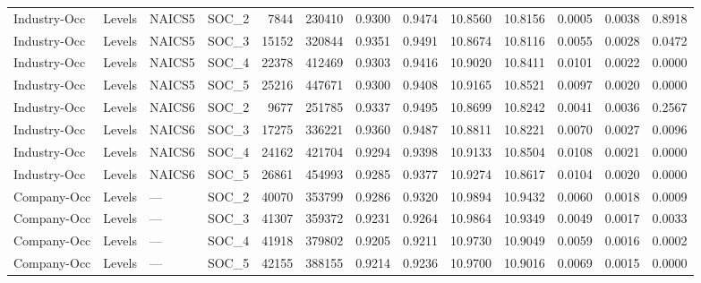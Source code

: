 \begin{table}
\begin{tabular}{lllrrrrrrrrr}
Industry-Occ & Levels & NAICS5 & SOC_2 & 7844 & 230410 & 0.9300 & 0.9474 & 10.8560 & 10.8156 & 0.0005 & 0.0038 & 0.8918 \\
Industry-Occ & Levels & NAICS5 & SOC_3 & 15152 & 320844 & 0.9351 & 0.9491 & 10.8674 & 10.8116 & 0.0055 & 0.0028 & 0.0472 \\
Industry-Occ & Levels & NAICS5 & SOC_4 & 22378 & 412469 & 0.9303 & 0.9416 & 10.9020 & 10.8411 & 0.0101 & 0.0022 & 0.0000 \\
Industry-Occ & Levels & NAICS5 & SOC_5 & 25216 & 447671 & 0.9300 & 0.9408 & 10.9165 & 10.8521 & 0.0097 & 0.0020 & 0.0000 \\
Industry-Occ & Levels & NAICS6 & SOC_2 & 9677 & 251785 & 0.9337 & 0.9495 & 10.8699 & 10.8242 & 0.0041 & 0.0036 & 0.2567 \\
Industry-Occ & Levels & NAICS6 & SOC_3 & 17275 & 336221 & 0.9360 & 0.9487 & 10.8811 & 10.8221 & 0.0070 & 0.0027 & 0.0096 \\
Industry-Occ & Levels & NAICS6 & SOC_4 & 24162 & 421704 & 0.9294 & 0.9398 & 10.9133 & 10.8504 & 0.0108 & 0.0021 & 0.0000 \\
Industry-Occ & Levels & NAICS6 & SOC_5 & 26861 & 454993 & 0.9285 & 0.9377 & 10.9274 & 10.8617 & 0.0104 & 0.0020 & 0.0000 \\
Company-Occ & Levels & — & SOC_2 & 40070 & 353799 & 0.9286 & 0.9320 & 10.9894 & 10.9432 & 0.0060 & 0.0018 & 0.0009 \\
Company-Occ & Levels & — & SOC_3 & 41307 & 359372 & 0.9231 & 0.9264 & 10.9864 & 10.9349 & 0.0049 & 0.0017 & 0.0033 \\
Company-Occ & Levels & — & SOC_4 & 41918 & 379802 & 0.9205 & 0.9211 & 10.9730 & 10.9049 & 0.0059 & 0.0016 & 0.0002 \\
Company-Occ & Levels & — & SOC_5 & 42155 & 388155 & 0.9214 & 0.9236 & 10.9700 & 10.9016 & 0.0069 & 0.0015 & 0.0000 \\
\bottomrule
\end{tabular}
\end{table}

